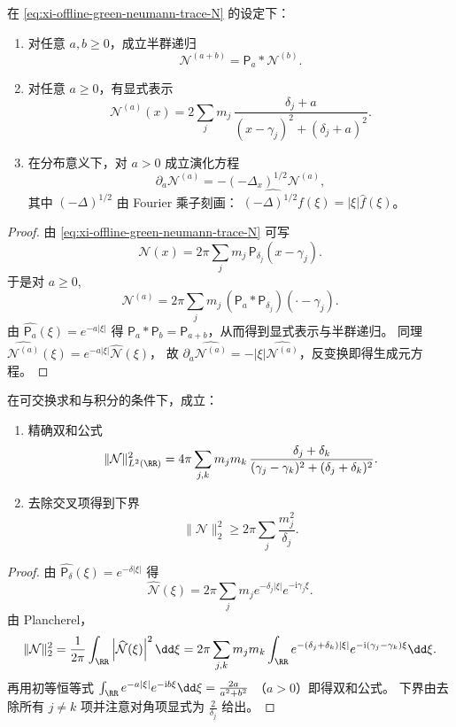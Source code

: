 \begin{theorem}\label{thm:xi-offline-neumann-cauchy-semigroup-generator}
在 \eqref{eq:xi-offline-green-neumann-trace-N} 的设定下：
\begin{enumerate}
  \item 对任意 \(a,b\ge 0\)，成立半群递归
  \[
  \mathcal N^{(a+b)}=\mathsf P_a*\mathcal N^{(b)}.
  \]
  \item 对任意 \(a\ge 0\)，有显式表示
  \[
  \mathcal N^{(a)}(x)
  =2\sum_j m_j\,\frac{\delta_j+a}{(x-\gamma_j)^2+(\delta_j+a)^2}.
  \]
  \item 在分布意义下，对 \(a>0\) 成立演化方程
  \[
  \partial_a\mathcal N^{(a)}=-(-\Delta_x)^{1/2}\mathcal N^{(a)},
  \]
  其中 \( (-\Delta)^{1/2}\) 由 Fourier 乘子刻画：
  \(\widehat{(-\Delta)^{1/2}f}(\xi)=|\xi|\hat f(\xi)\)。
\end{enumerate}
\end{theorem}
\begin{proof}
由 \eqref{eq:xi-offline-green-neumann-trace-N} 可写
\[
\mathcal N(x)=2\pi\sum_j m_j\,\mathsf P_{\delta_j}(x-\gamma_j).
\]
于是对 \(a\ge 0\),
\[
\mathcal N^{(a)}=2\pi\sum_j m_j\,(\mathsf P_a*\mathsf P_{\delta_j})(\cdot-\gamma_j).
\]
由 \(\widehat{\mathsf P_a}(\xi)=e^{-a|\xi|}\) 得 \(\mathsf P_a*\mathsf P_b=\mathsf P_{a+b}\)，从而得到显式表示与半群递归。
同理
\(
\widehat{\mathcal N^{(a)}}(\xi)=e^{-a|\xi|}\widehat{\mathcal N}(\xi)
\)，
故 \(\partial_a\widehat{\mathcal N^{(a)}}=-|\xi|\widehat{\mathcal N^{(a)}}\)，反变换即得生成元方程。
\end{proof}

\begin{theorem}\label{thm:xi-offline-neumann-l2-interaction}
在可交换求和与积分的条件下，成立：
\begin{enumerate}
  \item 精确双和公式
  \[
  \|\mathcal N\|_{L^2(\RR)}^2
  =4\pi\sum_{j,k}m_jm_k\,\frac{\delta_j+\delta_k}{(\gamma_j-\gamma_k)^2+(\delta_j+\delta_k)^2}.
  \]
  \item 去除交叉项得到下界
  \[
  \|\mathcal N\|_{2}^2\ge 2\pi\sum_j\frac{m_j^2}{\delta_j}.
  \]
\end{enumerate}
\end{theorem}
\begin{proof}
由 \(\widehat{\mathsf P_\delta}(\xi)=e^{-\delta|\xi|}\) 得
\[
\widehat{\mathcal N}(\xi)
=2\pi\sum_j m_j e^{-\delta_j|\xi|}e^{-\mathrm{i}\gamma_j\xi}.
\]
由 Plancherel，
\[
\|\mathcal N\|_2^2
=\frac{1}{2\pi}\int_{\RR}\left|\widehat{\mathcal N}(\xi)\right|^2\dd\xi
=2\pi\sum_{j,k}m_jm_k\int_{\RR}e^{-(\delta_j+\delta_k)|\xi|}e^{-\mathrm{i}(\gamma_j-\gamma_k)\xi}\dd\xi.
\]
再用初等恒等式
\(
\int_{\RR}e^{-a|\xi|}e^{-\mathrm{i}b\xi}\dd\xi=\frac{2a}{a^2+b^2}
\)
（\(a>0\)）即得双和公式。
下界由去除所有 \(j\neq k\) 项并注意对角项显式为 \(\frac{2}{\delta_j}\) 给出。
\end{proof}

